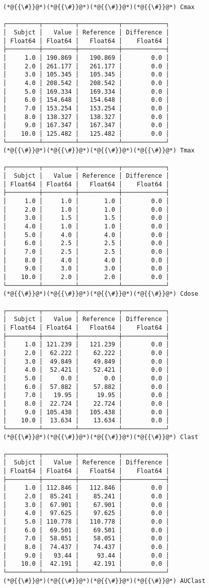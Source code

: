 \documentclass[12pt,a4paper]{article}
\begin{document}
\begin{lstlisting}
(*@{{\#}}@*)(*@{{\#}}@*)(*@{{\#}}@*)(*@{{\#}}@*) Cmax

┌─────────┬─────────┬───────────┬────────────┐
│  Subjct │   Value │ Reference │ Difference │
│ Float64 │ Float64 │   Float64 │    Float64 │
├─────────┼─────────┼───────────┼────────────┤
│     1.0 │ 190.869 │   190.869 │        0.0 │
│     2.0 │ 261.177 │   261.177 │        0.0 │
│     3.0 │ 105.345 │   105.345 │        0.0 │
│     4.0 │ 208.542 │   208.542 │        0.0 │
│     5.0 │ 169.334 │   169.334 │        0.0 │
│     6.0 │ 154.648 │   154.648 │        0.0 │
│     7.0 │ 153.254 │   153.254 │        0.0 │
│     8.0 │ 138.327 │   138.327 │        0.0 │
│     9.0 │ 167.347 │   167.347 │        0.0 │
│    10.0 │ 125.482 │   125.482 │        0.0 │
└─────────┴─────────┴───────────┴────────────┘
(*@{{\#}}@*)(*@{{\#}}@*)(*@{{\#}}@*)(*@{{\#}}@*) Tmax

┌─────────┬─────────┬───────────┬────────────┐
│  Subjct │   Value │ Reference │ Difference │
│ Float64 │ Float64 │   Float64 │    Float64 │
├─────────┼─────────┼───────────┼────────────┤
│     1.0 │     1.0 │       1.0 │        0.0 │
│     2.0 │     1.0 │       1.0 │        0.0 │
│     3.0 │     1.5 │       1.5 │        0.0 │
│     4.0 │     1.0 │       1.0 │        0.0 │
│     5.0 │     4.0 │       4.0 │        0.0 │
│     6.0 │     2.5 │       2.5 │        0.0 │
│     7.0 │     2.5 │       2.5 │        0.0 │
│     8.0 │     4.0 │       4.0 │        0.0 │
│     9.0 │     3.0 │       3.0 │        0.0 │
│    10.0 │     2.0 │       2.0 │        0.0 │
└─────────┴─────────┴───────────┴────────────┘
(*@{{\#}}@*)(*@{{\#}}@*)(*@{{\#}}@*)(*@{{\#}}@*) Cdose

┌─────────┬─────────┬───────────┬────────────┐
│  Subjct │   Value │ Reference │ Difference │
│ Float64 │ Float64 │   Float64 │    Float64 │
├─────────┼─────────┼───────────┼────────────┤
│     1.0 │ 121.239 │   121.239 │        0.0 │
│     2.0 │  62.222 │    62.222 │        0.0 │
│     3.0 │  49.849 │    49.849 │        0.0 │
│     4.0 │  52.421 │    52.421 │        0.0 │
│     5.0 │     0.0 │       0.0 │        0.0 │
│     6.0 │  57.882 │    57.882 │        0.0 │
│     7.0 │   19.95 │     19.95 │        0.0 │
│     8.0 │  22.724 │    22.724 │        0.0 │
│     9.0 │ 105.438 │   105.438 │        0.0 │
│    10.0 │  13.634 │    13.634 │        0.0 │
└─────────┴─────────┴───────────┴────────────┘
(*@{{\#}}@*)(*@{{\#}}@*)(*@{{\#}}@*)(*@{{\#}}@*) Clast

┌─────────┬─────────┬───────────┬────────────┐
│  Subjct │   Value │ Reference │ Difference │
│ Float64 │ Float64 │   Float64 │    Float64 │
├─────────┼─────────┼───────────┼────────────┤
│     1.0 │ 112.846 │   112.846 │        0.0 │
│     2.0 │  85.241 │    85.241 │        0.0 │
│     3.0 │  67.901 │    67.901 │        0.0 │
│     4.0 │  97.625 │    97.625 │        0.0 │
│     5.0 │ 110.778 │   110.778 │        0.0 │
│     6.0 │  69.501 │    69.501 │        0.0 │
│     7.0 │  58.051 │    58.051 │        0.0 │
│     8.0 │  74.437 │    74.437 │        0.0 │
│     9.0 │   93.44 │     93.44 │        0.0 │
│    10.0 │  42.191 │    42.191 │        0.0 │
└─────────┴─────────┴───────────┴────────────┘
(*@{{\#}}@*)(*@{{\#}}@*)(*@{{\#}}@*)(*@{{\#}}@*) AUClast


\end{lstlisting}
\end{document}
